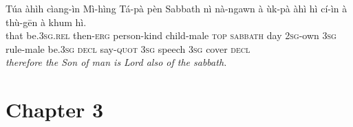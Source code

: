 \documentclass[11pt,a4paper]{article}
\begin{document}
\begin{exe}
\gll Túa àhìh cìang-ìn Mì-hìng Tá-pà pèn Sabbath nì nà-ngawn à ùk-pà àhì hì cí-ìn à thù-gēn à khum hì. \\
     that be.\textsc{3sg}.\textsc{rel} then-\textsc{erg} person-kind child-male \textsc{top} \textsc{sabbath} day \textsc{2sg}-own \textsc{3sg} rule-male be.\textsc{3sg} \textsc{decl} say-\textsc{quot} \textsc{3sg} speech \textsc{3sg} cover \textsc{decl} \\
\glt \textcolor{kjvcolor}{\textit{therefore the Son of man is Lord also of the sabbath.}}

\end{exe}
\newpage

\section*{Chapter 3}
\end{document}
